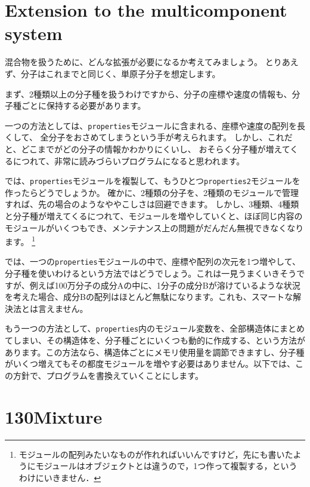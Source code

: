 \documentclass[a4,10pt]{article}
\begin{document}
\section{Extension to the multicomponent system}

混合物を扱うために、どんな拡張が必要になるか考えてみましょう。
とりあえず、分子はこれまでと同じく、単原子分子を想定します。

まず、2種類以上の分子種を扱うわけですから、分子の座標や速度の情報も、分子種ごとに保持する必要があります。

一つの方法としては、{\tt properties}モジュールに含まれる、座標や速度の配列を長くして、
全分子をおさめてしまうという手が考えられます。
しかし、これだと、どこまでがどの分子の情報かわかりにくいし、
おそらく分子種が増えてくるにつれて、非常に読みづらいプログラムになると思われます。

では、{\tt properties}モジュールを複製して、もうひとつ{\tt properties2}モジュールを作ったらどうでしょうか。
確かに、2種類の分子を、2種類のモジュールで管理すれば、先の場合のようなややこしさは回避できます。
しかし、3種類、4種類と分子種が増えてくるにつれて、モジュールを増やしていくと、ほぼ同じ内容の
モジュールがいくつもでき、メンテナンス上の問題がだんだん無視できなくなります。
\footnote{モジュールの配列みたいなものが作れればいいんですけど，先にも書いたようにモジュールはオブジェクトとは違うので，1つ作って複製する，というわけにいきません．}

では、一つの{\tt properties}モジュールの中で、座標や配列の次元を1つ増やして、分子種を使いわけるという方法ではどうでしょう。これは一見うまくいきそうですが、例えば100万分子の成分Aの中に、1分子の成分Bが溶けているような状況を考えた場合、成分Bの配列はほとんど無駄になります。これも、スマートな解決法とは言えません。

もう一つの方法として、{\tt properties}内のモジュール変数を、全部構造体にまとめてしまい、その構造体を、分子種ごとにいくつも動的に作成する、という方法があります。この方法なら、構造体ごとにメモリ使用量を調節できますし、分子種がいくつ増えてもその都度モジュールを増やす必要はありません。以下では、この方針で、プログラムを書換えていくことにします。

\section{130Mixture}
\end{document}
